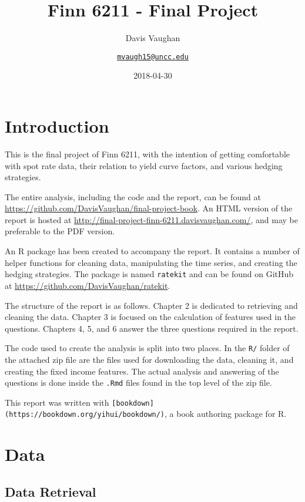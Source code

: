 \documentclass[openany]{book}
\title{Finn 6211 - Final Project}
\subtitle{Davis Vaughan}
\author{\href{mailto:mvaugh15@uncc.edu}{\nolinkurl{mvaugh15@uncc.edu}}}
\date{2018-04-30}
\theoremstyle{definition}
\theoremstyle{definition}
\theoremstyle{definition}
\theoremstyle{remark}
\begin{document}
\maketitle

{
\setcounter{tocdepth}{1}
\tableofcontents
}
\hypertarget{titlepage}{%
\chapter{Introduction}\label{titlepage}}

This is the final project of Finn 6211, with the intention of getting
comfortable with spot rate data, their relation to yield curve factors,
and various hedging strategies.

The entire analysis, including the code and the report, can be found at
\url{https://github.com/DavisVaughan/final-project-book}. An HTML
version of the report is hosted at
\url{http://final-project-finn-6211.davisvaughan.com/}, and may be
preferable to the PDF version.

An R package has been created to accompany the report. It contains a
number of helper functions for cleaning data, manipulating the time
series, and creating the hedging strategies. The package is named
\texttt{ratekit} and can be found on GitHub at
\url{https://github.com/DavisVaughan/ratekit}.

The structure of the report is as follows. Chapter 2 is dedicated to
retrieving and cleaning the data. Chapter 3 is focused on the
calculation of features used in the questions. Chapters 4, 5, and 6
answer the three questions required in the report.

The code used to create the analysis is split into two places. In the
\texttt{R/} folder of the attached zip file are the files used for
downloading the data, cleaning it, and creating the fixed income
features. The actual analysis and answering of the questions is done
inside the \texttt{.Rmd} files found in the top level of the zip file.

This report was written with
\texttt{{[}bookdown{]}(https://bookdown.org/yihui/bookdown/)}, a book
authoring package for R.

\small

\normalsize

\hypertarget{data}{%
\chapter{Data}\label{data}}

\hypertarget{retrieve}{%
\section{Data Retrieval}\label{retrieve}}
\end{document}
